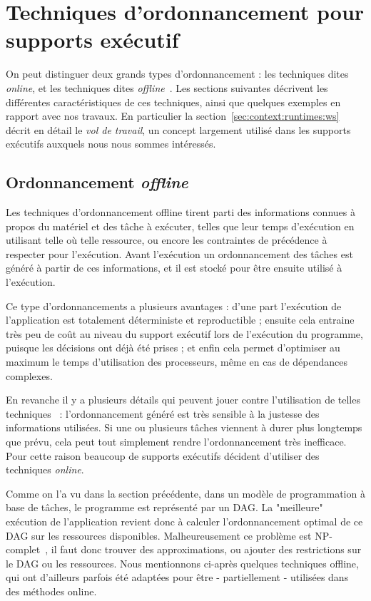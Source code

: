 \section{Techniques d'ordonnancement pour supports exécutif}\label{sec:context:runtimes}

On peut distinguer deux grands types d'ordonnancement : les techniques dites \emph{online}, et les techniques dites \emph{offline}~\cite{Karp1992}.
Les sections suivantes décrivent les différentes caractéristiques de ces techniques, ainsi que quelques exemples en rapport avec nos travaux.
En particulier la section~\ref{sec:context:runtimes:ws} décrit en détail le \emph{vol de travail}, un concept largement utilisé dans les supports exécutifs auxquels nous nous sommes intéressés.

\subsection{Ordonnancement \emph{offline}}

Les techniques d'ordonnancement offline tirent parti des informations connues à propos du matériel et des tâche à exécuter, telles que leur temps d'exécution en utilisant telle où telle ressource, ou encore les contraintes de précédence à respecter pour l'exécution.
Avant l'exécution un ordonnancement des tâches est généré à partir de ces informations, et il est stocké pour être ensuite utilisé à l'exécution.

Ce type d'ordonnancements a plusieurs avantages : d'une part l'exécution de l'application est totalement déterministe et reproductible ; ensuite cela entraine très peu de coût au niveau du support exécutif lors de l'exécution du programme, puisque les décisions ont déjà été prises ; et enfin cela permet d'optimiser au maximum le temps d'utilisation des processeurs, même en cas de dépendances complexes.

En revanche il y a plusieurs détails qui peuvent jouer contre l'utilisation de telles techniques~\cite{Locke1992} : l'ordonnancement généré est très sensible à la justesse des informations utilisées. Si une ou plusieurs tâches viennent à durer plus longtemps que prévu, cela peut tout simplement rendre l'ordonnancement très inefficace.
Pour cette raison beaucoup de supports exécutifs décident d'utiliser des techniques \emph{online}.

Comme on l'a vu dans la section précédente, dans un modèle de programmation à base de tâches, le programme est représenté par un DAG.
La "meilleure" exécution de l'application revient donc à calculer l'ordonnancement optimal de ce DAG sur les ressources disponibles.
Malheureusement ce problème est NP-complet~\cite{Cook1971}, il faut donc trouver des approximations, ou ajouter des restrictions sur le DAG ou les ressources.
Nous mentionnons ci-après quelques techniques offline, qui ont d'ailleurs parfois été adaptées pour être - partiellement - utilisées dans des méthodes online.

